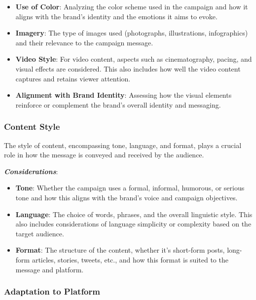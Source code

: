 \documentclass[
]{book}
\providecommand{\tightlist}{%
  \setlength{\itemsep}{0pt}\setlength{\parskip}{0pt}}
\begin{document}
\begin{itemize}
\tightlist
\item
  \textbf{Use of Color}: Analyzing the color scheme used in the campaign and how it aligns with the brand's identity and the emotions it aims to evoke.
\item
  \textbf{Imagery}: The type of images used (photographs, illustrations, infographics) and their relevance to the campaign message.
\item
  \textbf{Video Style}: For video content, aspects such as cinematography, pacing, and visual effects are considered. This also includes how well the video content captures and retains viewer attention.
\item
  \textbf{Alignment with Brand Identity}: Assessing how the visual elements reinforce or complement the brand's overall identity and messaging.
\end{itemize}

\hypertarget{content-style}{%
\subsubsection*{Content Style}\label{content-style}}

The style of content, encompassing tone, language, and format, plays a crucial role in how the message is conveyed and received by the audience.

\textbf{\emph{Considerations}}:

\begin{itemize}
\tightlist
\item
  \textbf{Tone}: Whether the campaign uses a formal, informal, humorous, or serious tone and how this aligns with the brand's voice and campaign objectives.
\item
  \textbf{Language}: The choice of words, phrases, and the overall linguistic style. This also includes considerations of language simplicity or complexity based on the target audience.
\item
  \textbf{Format}: The structure of the content, whether it's short-form posts, long-form articles, stories, tweets, etc., and how this format is suited to the message and platform.
\end{itemize}

\hypertarget{adaptation-to-platform}{%
\subsubsection*{Adaptation to Platform}\label{adaptation-to-platform}}
\end{document}
